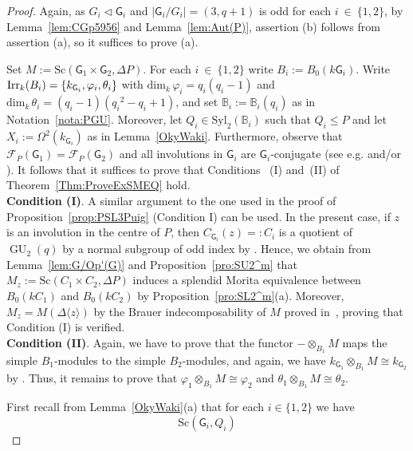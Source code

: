 \documentclass[12pt,a4paper]{amsart}
\theoremstyle{plain}\newtheorem{Theorem}{Theorem}[section]
\theoremstyle{plain}\newtheorem{Conjecture}[Theorem]{Conjecture}
\theoremstyle{plain}\newtheorem{Corollary}[Theorem]{Corollary}
\theoremstyle{plain}\newtheorem{Lemma}[Theorem]{Lemma}
\theoremstyle{plain}\newtheorem{Proposition}[Theorem]{Proposition}
\theoremstyle{definition}\newtheorem{Definition}[Theorem]{Definition}
\theoremstyle{definition}\newtheorem{Example}[Theorem]{Example}
\theoremstyle{definition}\newtheorem{Examples}[Theorem]{Examples}
\theoremstyle{definition}\newtheorem{Remark}[Theorem]{Remark}
\theoremstyle{definition}\newtheorem{Question}[Theorem]{Question}
\theoremstyle{definition}\newtheorem{Notation}[Theorem]{Notation}
\theoremstyle{definition}\newtheorem{Hypothesis}[Theorem]{Hypothesis}
\theoremstyle{definition}\newtheorem{Assumption}[Theorem]{Assumption}
\theoremstyle{definition}\newtheorem{Strategy}[Theorem]{Strategy}
\theoremstyle{definition}\newtheorem{Contents}[Theorem]{Contents}
\theoremstyle{definition}\newtheorem{Computations}[Theorem]{Computations}
\theoremstyle{definition}\newtheorem{Equivalences}[Theorem]{Equivalences}
\theoremstyle{definition}\newtheorem{Notation/Definition}[Theorem]{Notation/Definition}
\theoremstyle{definition}\newtheorem{noth}[Theorem]{}
\theoremstyle{plain}\newtheorem{Step}[Theorem]{Step}
\def\Syl{\mathrm{Syl}}
\def\dim{\mathrm{dim}}
\newcommand{\GU}{\operatorname{GU}}
\newcommand{\Sc}{{\text{Sc}}}
\begin{document}
\begin{proof}
Again, as $G_{i}\lhd\mathsf{G}_{i}$ and $|\mathsf G_i/G_i|=(3,q+1)$ is odd for each 
$i~\in~\{1,2\}$, by Lemma~\ref{lem:CGp5956} and Lemma~\ref{lem:Aut(P)}, 
assertion (b) follows from assertion (a), so it suffices to prove (a).
\par
Set $M:={\mathrm{Sc}}(\mathsf{G}_1\times \mathsf{G}_2,\Delta P)$. For each $i~\in~\{1,2\}$ 
write  $B_{i}:=B_{0}(k\mathsf{G}_{i})$. Write $\mathrm{Irr}_{k}(B_{i})=\{k_{\mathsf{G}_{i}},\varphi_{i},\theta_{i}\}$
with $\dim_k\,\varphi_i={q_i}(q_i-1)$ and $\dim_k\,\theta_i=(q_i-1)({q_i}^2-q_i+1)$, 
and set $\mathbb{B}_{i}:=\mathbb{B}_{i}(q_{i})$
as in Notation~\ref{nota:PGU}. Moreover, let $Q_i\in\Syl_{2}(\mathbb B_i)$ such that 
$Q_{i}\leq P$ and let $X_{i}:=\Omega^{2}(k_{\mathsf{G}_{i}})$ as in Lemma~\ref{OkyWaki}.
Furthermore,  observe that 
$\mathcal F_P(\mathsf{G}_1)=\mathcal F_P(\mathsf{G}_2)$  and 
all involutions in $\mathsf{G}_i$ are $\mathsf{G}_i$-conjugate (see e.g. \cite[Theorem~5.3]{CG12} 
and/or \cite[Proposition~2 on p.11]{ABG70}).  It follows that it suffices to prove that Conditions~
(I) and~(II) of Theorem~\ref{Thm:ProveExSMEQ} \smallskip hold.\\
%
{\bf Condition (I)}.
A similar argument to the one used  in the proof of Proposition~\ref{prop:PSL3Puig} 
(Condition I) can be used. In the present case, if $z$ is an involution in the centre of $P$, 
then $C_{\mathsf{G}_{i}}(z)=:C_i$ is a quotient of $\GU_{2}(q)$ by a normal subgroup of odd 
index by \cite[Proposition 4(iii)]{ABG70}.
Hence, we obtain from Lemma~\ref{lem:G/Op'(G)} and Proposition~\ref{pro:SU2^m}
that $M_{z}:=\Sc(C_1\times C_2,\Delta P)$ induces a splendid Morita equivalence between 
$B_0(kC_1)$ and $B_0(kC_2)$ by Proposition~\ref{pro:SL2^m}(a). Moreover, 
$M_z=M(\Delta\langle z\rangle)$  by the Brauer indecomposability of $M$ proved 
in~\cite[Theorem~1.1]{KT20}, proving that Condition (I) is \smallskip verified.\\
%
{\bf Condition (II)}. 
Again, we have to prove that the functor $-\otimes_{B_1}M$ maps 
the simple $B_{1}$-modules to the simple $B_{2}$-modules, and again, we have 
$k_{\mathsf{G}_1}\otimes_{B_1}M\cong k_{\mathsf{G}_2}$ by \cite[Lemma~3.4(a)]{KL20a}. 
Thus, it remains to prove that $\varphi_{1}\otimes_{B_{1}}M\cong \varphi_{2}$ 
and $\theta_{1}\otimes_{B_{1}}M\cong \theta_{2}$.
\par
First recall from Lemma~\ref{OkyWaki}(a) that for each $i\in\{1, 2\}$ we have 
\begin{equation}\label{ScottBorel}
\Sc({\mathsf{G}}_i, Q_i)

\end{equation}
\end{proof}
\end{document}
